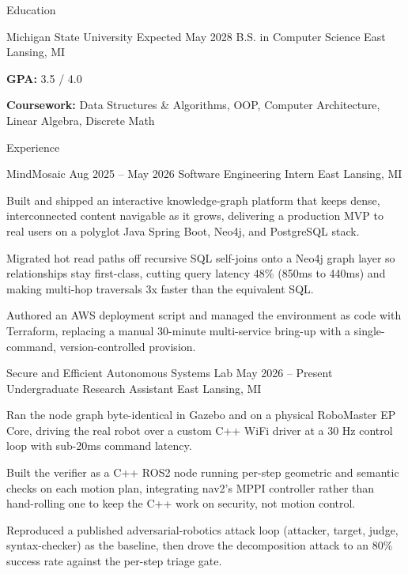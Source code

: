 \documentclass[
	11pt
]{../../../template}
\begin{document}
	\begin{rSection}{E}{ducation}
		\begin{rSectionEntry}
			{Michigan State University}
			{Expected May 2028}
			{B.S. in Computer Science}
			{}
			{East Lansing, MI}

			\item \textbf{GPA:} 3.5 / 4.0
			\item \textbf{Coursework:} Data Structures \& Algorithms, OOP, Computer Architecture, Linear Algebra, Discrete Math
		\end{rSectionEntry}
	\end{rSection}

	\begin{rSection}{E}{xperience}
		\begin{rSectionEntry}
			{MindMosaic}
			{Aug 2025 -- May 2026}
			{Software Engineering Intern}
			{}
			{East Lansing, MI}

			\item Built and shipped an interactive knowledge-graph platform that keeps dense, interconnected content navigable as it grows, delivering a production MVP to real users on a polyglot Java Spring Boot, Neo4j, and PostgreSQL stack.
			\item Migrated hot read paths off recursive SQL self-joins onto a Neo4j graph layer so relationships stay first-class, cutting query latency 48\% (850ms to 440ms) and making multi-hop traversals 3x faster than the equivalent SQL.
			\item Authored an AWS deployment script and managed the environment as code with Terraform, replacing a manual 30-minute multi-service bring-up with a single-command, version-controlled provision.
		\end{rSectionEntry}

		\begin{rSectionEntry}
			{Secure and Efficient Autonomous Systems Lab}
			{May 2026 -- Present}
			{Undergraduate Research Assistant}
			{}
			{East Lansing, MI}

			\item Ran the node graph byte-identical in Gazebo and on a physical RoboMaster EP Core, driving the real robot over a custom C++ WiFi driver at a 30 Hz control loop with sub-20ms command latency.
			\item Built the verifier as a C++ ROS2 node running per-step geometric and semantic checks on each motion plan, integrating nav2's MPPI controller rather than hand-rolling one to keep the C++ work on security, not motion control.
			\item Reproduced a published adversarial-robotics attack loop (attacker, target, judge, syntax-checker) as the baseline, then drove the decomposition attack to an 80\% success rate against the per-step triage gate.
		\end{rSectionEntry}


\end{rSection}
\end{document}
